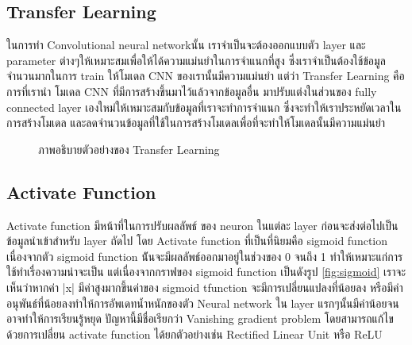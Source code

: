 \documentclass[12pt,oneside,openright,a4paper]{cpe-thai-project}
\begin{document}
\subsection{Transfer Learning\cite{Transfer}}
ในการทำ Convolutional neural networkนั้น เราจำเป็นจะต้องออกแบบตัว layer และ parameter ต่างๆให้เหมาะสมเพื่อให้ได้ความแม่นยำในการจำแนกที่สูง
ซึ่งเราจำเป็นต้องใช้ข้อมูลจำนวนมากในการ train ให้โมเดล CNN ของเรานั้นมีความแม่นยำ แต่ว่า Transfer Learning คือการที่เรานำ โมเดล CNN ที่มีการสร้างขึ้นมาไว้แล้วจากข้อมูลอื่น มาปรับแต่งในส่วนของ
fully connected layer เองใหม่ให้เหมาะสมกับข้อมูลที่เราจะทำการจำแนก ซึ่งจะทำให้เราประหยัดเวลาในการสร้างโมเดล และลดจำนวนข้อมูลที่ใช้ในการสร้างโมเดลเพื่อที่จะทำให้โมเดลนั้นมีความแม่นยำ
\begin{figure}[!ht]\centering
  \setlength{\fboxrule}{0.2mm} %
  \setlength{\fboxsep}{1cm}
  \caption{ภาพอธิบายตัวอย่างของ Transfer Learning}\label{fig:transfer}
\end{figure}

\newpage 
\subsection{Activate Function\cite{Activate}}
Activate function มีหน้าที่ในการปรับผลลัพธ์ ของ neuron ในแต่ละ layer ก่อนจะส่งต่อไปเป็นข้อมูลนำเข้าสำหรับ layer ถัดไป โดย Activate function ที่เป็นที่นิยมคือ sigmoid function เนื่องจากตัว sigmoid function 
น้ันจะมีผลลัพธ์ออกมาอยู่ในช่วงของ 0 จนถึง 1 ทำให้เหมาะแก่การใช้ทำเรื่องความน่าจะเป็น แต่เนื่องจากกราฟของ sigmoid function เป็นดังรูป \ref{fig:sigmoid}  เราจะเห็นว่าหากค่า |x| มีค่าสูงมากขึ้นค่าของ sigmoid tfunction จะมีการเปลี่ยนแปลงที่น้อยลง 
หรือมีค่าอนุพันธ์ที่น้อยลงทำให้การอัพเดทน้ำหนักของตัว Neural network ใน layer แรกๆนั้นมีค่าน้อยจนอาจทำให้การเรียนรู้หยุด  
ปัญหานี้มีชื่อเรียกว่า Vanishing gradient problem โดยสามารถแก้ไขด้วยการเปลี่ยน activate function ได้ยกตัวอย่างเช่น Rectified Linear Unit หรือ ReLU
\end{document}
